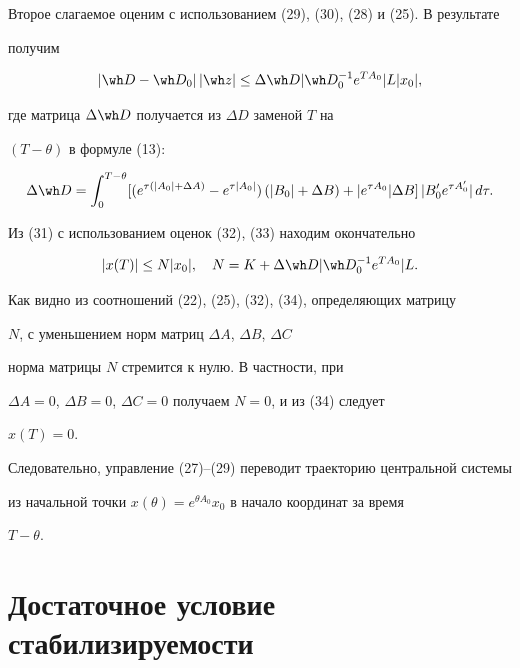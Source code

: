 Второе слагаемое оценим с использованием (29), (30), (28) и (25). В результате


получим


\begin{equation}


|\wh D -\wh D_0| \,|\wh z| \le


\Delta \wh D | \wh D_0^{-1} e^{TA_0}| L |x_0|,


\end{equation}


где матрица $\Delta \wh D$ получается из $\Delta D$ заменой $T$ на


$(T-\theta)$ в формуле (13):


$$


\Delta \wh D = \int_{0}^{T-\theta}


[(e^{ \tau ( |A_0|+\Delta A ) } -e^{\tau |A_0|})\,


( |B_0|+\Delta B )+| e^{ \tau A_0 } | \Delta B]


\, |B_0' e^{ \tau A_0' }| \, d\tau.


$$


Из (31) с использованием оценок (32), (33) находим окончательно


\begin{equation}


|x(T)| \le N |x_0|, \quad  N=K+\Delta \wh D |\wh D_0^{-1} e^{TA_0}| L.


\end{equation} %





Как видно из соотношений (22), (25), (32), (34), определяющих матрицу


$N$, с уменьшением норм матриц $\Delta A$, $\Delta B$, $\Delta C$


норма матрицы $N$ стремится к нулю. В частности, при


$\Delta A=0$, $\Delta B=0$, $\Delta C=0$ получаем $N=0$, и из (34) следует


$x(T)=0$.


Следовательно, управление (27)--(29) переводит траекторию центральной системы


из начальной точки $x(\theta)=e^{\theta A_0}x_0$ в начало координат за время


$T-\theta$.





\section{Достаточное условие стабилизируемости}





